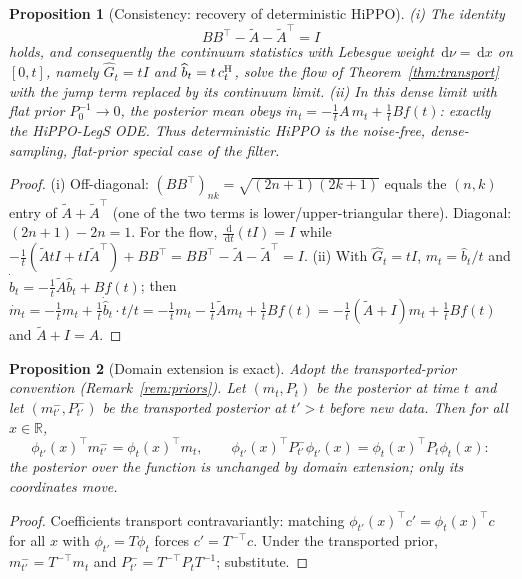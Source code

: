 \documentclass[11pt]{article}
\newtheorem{proposition}{Proposition}
\newcommand{\R}{\mathbb{R}}
\newcommand{\dd}{\,\mathrm{d}}
\newcommand{\At}{\widetilde{A}}
\newcommand{\Gh}{\widehat{G}}
\newcommand{\bh}{\widehat{b}}
\begin{document}
\begin{proposition}[Consistency: recovery of deterministic HiPPO]\label{prop:recover}
(i) The identity
\begin{equation}
    BB^\top-\At-\At^\top=I
\end{equation}
holds, and consequently the continuum statistics with Lebesgue weight $\dd\nu=\dd x$ on $[0,t]$, namely $\Gh_t=tI$ and $\bh_t=t\,c_t^{\rm H}$, solve the flow of Theorem~\ref{thm:transport} with the jump term replaced by its continuum limit. (ii) In this dense limit with flat prior $P_0^{-1}\to0$, the posterior mean obeys
$\dot m_t=-\tfrac1t A\,m_t+\tfrac1t B f(t)$: exactly the HiPPO-LegS ODE. Thus deterministic HiPPO is the noise-free, dense-sampling, flat-prior special case of the filter.
\end{proposition}
\begin{proof}
(i) Off-diagonal: $(BB^\top)_{nk}=\sqrt{(2n+1)(2k+1)}$ equals the $(n,k)$ entry of $\At+\At^\top$ (one of the two terms is lower/upper-triangular there). Diagonal: $(2n+1)-2n=1$. For the flow, $\tfrac{\dd}{\dd t}(tI)=I$ while $-\tfrac1t(\At tI+tI\At^\top)+BB^\top=BB^\top-\At-\At^\top=I$. (ii) With $\Gh_t=tI$, $m_t=\bh_t/t$ and $\dot\bh_t=-\tfrac1t\At\bh_t+Bf(t)$; then
$\dot m_t=-\tfrac1t m_t+\tfrac1t\dot\bh_t\cdot t/t=-\tfrac1t m_t-\tfrac1t\At m_t+\tfrac1t Bf(t)=-\tfrac1t(\At+I)m_t+\tfrac1t Bf(t)$ and $\At+I=A$.
\end{proof}

\begin{proposition}[Domain extension is exact]\label{prop:preserve}
Adopt the transported-prior convention (Remark~\ref{rem:priors}). Let $(m_t,P_t)$ be the posterior at time $t$ and let $(m^-_{t'},P^-_{t'})$ be the transported posterior at $t'>t$ before new data. Then for all $x\in\R$,
\begin{equation}
    \phi_{t'}(x)^\top m^-_{t'}=\phi_t(x)^\top m_t,
    \qquad
    \phi_{t'}(x)^\top P^-_{t'}\phi_{t'}(x)=\phi_t(x)^\top P_t\phi_t(x):
\end{equation}
the posterior over the \emph{function} is unchanged by domain extension; only its coordinates move.
\end{proposition}
\begin{proof}
Coefficients transport contravariantly: matching $\phi_{t'}(x)^\top c'=\phi_t(x)^\top c$ for all $x$ with $\phi_{t'}=T\phi_t$ forces $c'=T^{-\top}c$. Under the transported prior, $m^-_{t'}=T^{-\top}m_t$ and $P^-_{t'}=T^{-\top}P_tT^{-1}$; substitute.
\end{proof}
\end{document}
